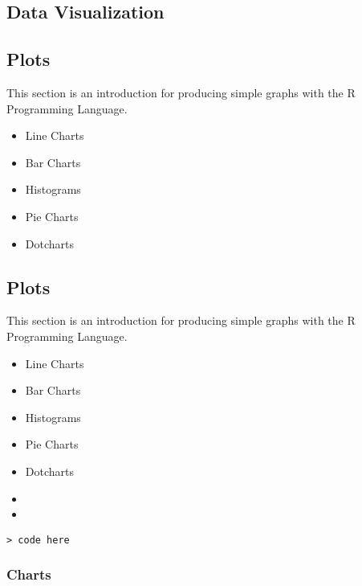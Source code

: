\begin{frame}



\newpage


\chapter{Data Visualization}
\section{Plots}
This section is an introduction for producing simple graphs with
the R Programming Language.
\begin{itemize}
	\item Line Charts  \item Bar Charts \item Histograms \item Pie
	Charts \item Dotcharts
\end{itemize}



\section{Plots}
This section is an introduction for producing simple graphs with
the R Programming Language.
\begin{itemize}
\item Line Charts  \item Bar Charts \item Histograms \item Pie
Charts \item Dotcharts
\end{itemize}


\begin{itemize}
\item
\item
\end{itemize}
\footnotesize \begin{verbatim}
> code here
 \end{verbatim}\normalsize


\subsection{ Charts}


\end{frame}
